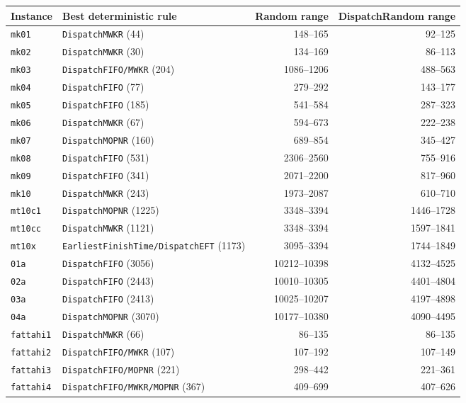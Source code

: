 ﻿\documentclass[11pt]{article}
\begin{document}
\begin{table}[h]
\centering
\begin{tabular}{llrr}
\toprule
Instance & Best deterministic rule & Random range & DispatchRandom range \\
\midrule
\texttt{mk01} & \texttt{DispatchMWKR} (44) & 148--165 & 92--125 \\
\texttt{mk02} & \texttt{DispatchMWKR} (30) & 134--169 & 86--113 \\
\texttt{mk03} & \texttt{DispatchFIFO/MWKR} (204) & 1086--1206 & 488--563 \\
\texttt{mk04} & \texttt{DispatchFIFO} (77) & 279--292 & 143--177 \\
\texttt{mk05} & \texttt{DispatchFIFO} (185) & 541--584 & 287--323 \\
\texttt{mk06} & \texttt{DispatchMWKR} (67) & 594--673 & 222--238 \\
\texttt{mk07} & \texttt{DispatchMOPNR} (160) & 689--854 & 345--427 \\
\texttt{mk08} & \texttt{DispatchFIFO} (531) & 2306--2560 & 755--916 \\
\texttt{mk09} & \texttt{DispatchFIFO} (341) & 2071--2200 & 817--960 \\
\texttt{mk10} & \texttt{DispatchMWKR} (243) & 1973--2087 & 610--710 \\
\texttt{mt10c1} & \texttt{DispatchMOPNR} (1225) & 3348--3394 & 1446--1728 \\
\texttt{mt10cc} & \texttt{DispatchMWKR} (1121) & 3348--3394 & 1597--1841 \\
\texttt{mt10x} & \texttt{EarliestFinishTime/DispatchEFT} (1173) & 3095--3394 & 1744--1849 \\
\texttt{01a} & \texttt{DispatchFIFO} (3056) & 10212--10398 & 4132--4525 \\
\texttt{02a} & \texttt{DispatchFIFO} (2443) & 10010--10305 & 4401--4804 \\
\texttt{03a} & \texttt{DispatchFIFO} (2413) & 10025--10207 & 4197--4898 \\
\texttt{04a} & \texttt{DispatchMOPNR} (3070) & 10177--10380 & 4090--4495 \\
\texttt{fattahi1} & \texttt{DispatchMWKR} (66) & 86--135 & 86--135 \\
\texttt{fattahi2} & \texttt{DispatchFIFO/MWKR} (107) & 107--192 & 107--149 \\
\texttt{fattahi3} & \texttt{DispatchFIFO/MOPNR} (221) & 298--442 & 221--361 \\
\texttt{fattahi4} & \texttt{DispatchFIFO/MWKR/MOPNR} (367) & 409--699 & 407--626 \\

\end{tabular}
\end{table}
\end{document}
